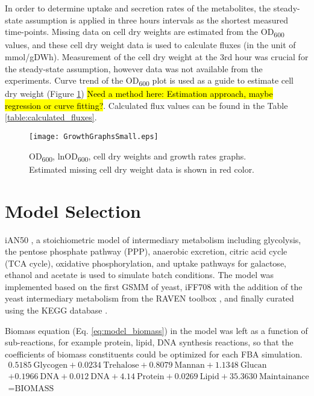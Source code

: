 In order to determine uptake and secretion rates of the metabolites, the steady-state assumption is applied in three hours intervals as the shortest measured time-points. Missing data on cell dry weights are estimated from the OD\textsubscript{600} values, and these cell dry weight data is used to calculate fluxes (in the unit of mmol/gDWh). Measurement of the cell dry weight at the 3rd hour was crucial for the steady-state assumption, however data was not available from the experiments. Curve trend of the OD\textsubscript{600} plot is used as a guide to estimate cell dry weight (Figure \ref{fig:GrowthGraphs}) \hl{Need a method here: Estimation approach, maybe regression or curve fitting?}. Calculated flux values can be found in the Table \ref{table:calculated_fluxes}.
\begin{figure}[H]
  \begin{center}
  \texttt{[image: GrowthGraphsSmall.eps]}
  \end{center}
  \caption[OD\textsubscript{600}, lnOD\textsubscript{600}, cell dry weights and growth rates]{OD\textsubscript{600}, lnOD\textsubscript{600}, cell dry weights and growth rates graphs. Estimated missing cell dry weight data is shown in red color.}
\label{fig:GrowthGraphs}
\end{figure}



\section{Model Selection}
iAN50 \cite{nilsson2016metabolic}, a stoichiometric model of intermediary metabolism including glycolysis, the pentose phosphate pathway (PPP), anaerobic excretion, citric acid cycle (TCA cycle), oxidative phosphorylation, and uptake pathways for galactose, ethanol and acetate is used to simulate batch conditions. The model was implemented based on the first GSMM of yeast, iFF708 \cite{forster2003genome} with the addition of the yeast intermediary metabolism from the RAVEN toolbox \cite{agren2013raven}, and finally curated using the KEGG database \cite{kanehisa2000kegg}.

Biomass equation (Eq. \ref{eq:model_biomass}) in the model was left as a function of sub-reactions, for example protein, lipid, DNA synthesis reactions, so that the coefficients of biomass constituents could be optimized for each FBA simulation.
\begin{multline}
  0.5185\ \textrm{Glycogen} + 0.0234\ \textrm{Trehalose} + 0.8079\ \textrm{Mannan} + 1.1348\ \textrm{Glucan} \\
  + 0.1966\ \textrm{DNA} + 0.012\ \textrm{DNA} +  4.14\ \textrm{Protein} + 0.0269\ \textrm{Lipid} + 35.3630 \ \textrm{Maintainance} \\
  = \textrm{BIOMASS}
   \label{eq:model_biomass}
\end{multline}

